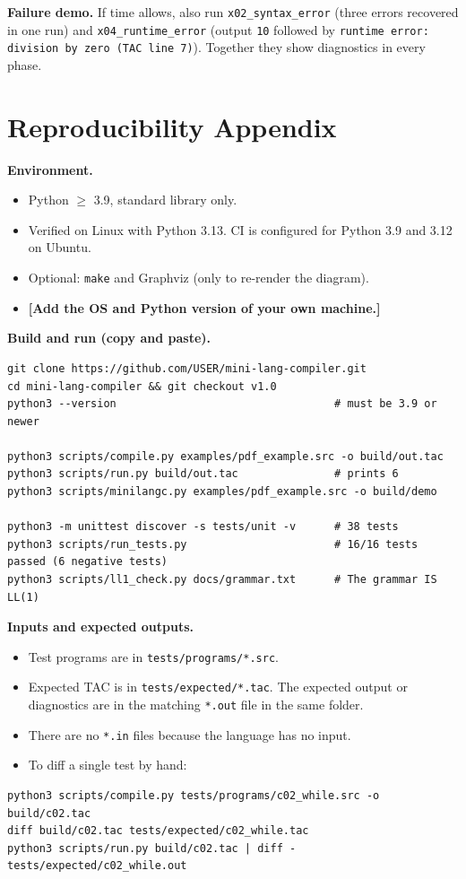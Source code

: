 \documentclass[11pt,letterpaper]{article}
\newcommand{\fillin}[1]{\textcolor{fill}{\textbf{[#1]}}}   %
\newcommand{\code}[1]{\texttt{#1}}
\begin{document}
\textbf{Failure demo.} If time allows, also run \code{x02\_syntax\_error} (three errors recovered in one run) and \code{x04\_runtime\_error} (output \code{10} followed by \code{runtime error: division by zero (TAC line 7)}). Together they show diagnostics in every phase.

\section{Reproducibility Appendix}

\textbf{Environment.}
\begin{itemize}
  \item Python $\geq$ 3.9, standard library only.
  \item Verified on Linux with Python 3.13. CI is configured for Python 3.9 and 3.12 on Ubuntu.
  \item Optional: \code{make} and Graphviz (only to re-render the diagram).
  \item \fillin{Add the OS and Python version of your own machine.}
\end{itemize}

\textbf{Build and run (copy and paste).}
\begin{lstlisting}
git clone https://github.com/USER/mini-lang-compiler.git
cd mini-lang-compiler && git checkout v1.0
python3 --version                                  # must be 3.9 or newer

python3 scripts/compile.py examples/pdf_example.src -o build/out.tac
python3 scripts/run.py build/out.tac               # prints 6
python3 scripts/minilangc.py examples/pdf_example.src -o build/demo

python3 -m unittest discover -s tests/unit -v      # 38 tests
python3 scripts/run_tests.py                       # 16/16 tests passed (6 negative tests)
python3 scripts/ll1_check.py docs/grammar.txt      # The grammar IS LL(1)
\end{lstlisting}

\textbf{Inputs and expected outputs.}
\begin{itemize}
  \item Test programs are in \code{tests/programs/*.src}.
  \item Expected TAC is in \code{tests/expected/*.tac}. The expected output or diagnostics are in the matching \code{*.out} file in the same folder.
  \item There are no \code{*.in} files because the language has no input.
  \item To diff a single test by hand:
\end{itemize}
\begin{lstlisting}
python3 scripts/compile.py tests/programs/c02_while.src -o build/c02.tac
diff build/c02.tac tests/expected/c02_while.tac
python3 scripts/run.py build/c02.tac | diff - tests/expected/c02_while.out
\end{lstlisting}
\end{document}

